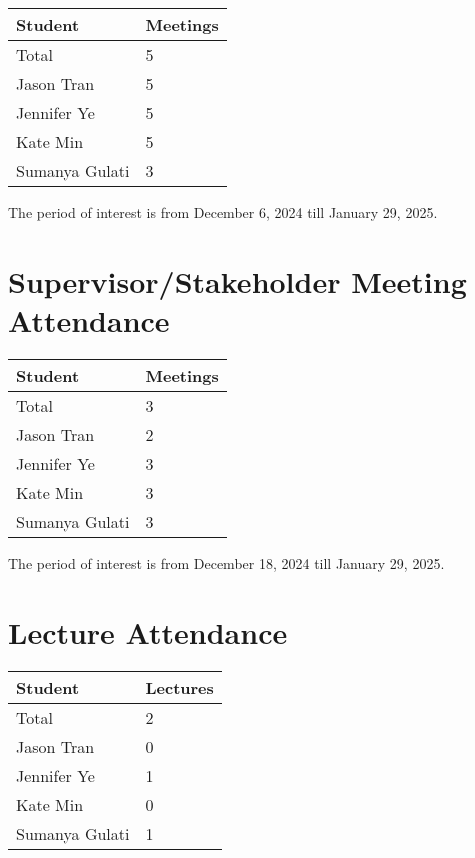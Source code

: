 \documentclass{article}
\begin{document}
\begin{table}[H]
\centering
\begin{tabular}{ll}
\toprule
\textbf{Student} & \textbf{Meetings}\\
\midrule
Total & 5\\
Jason Tran & 5\\
Jennifer Ye & 5\\
Kate Min & 5\\
Sumanya Gulati & 3\\
\bottomrule
\end{tabular}
\end{table}

The period of interest is from December 6, 2024 till January 29, 2025.

\section{Supervisor/Stakeholder Meeting Attendance}

\begin{table}[H]
\centering
\begin{tabular}{ll}
\toprule
\textbf{Student} & \textbf{Meetings}\\
\midrule
Total & 3\\
Jason Tran & 2\\
Jennifer Ye & 3\\
Kate Min & 3\\
Sumanya Gulati & 3\\
\bottomrule
\end{tabular}
\end{table}

The period of interest is from December 18, 2024 till January 29, 2025.

\section{Lecture Attendance}

\begin{table}[H]
\centering
\begin{tabular}{ll}
\toprule
\textbf{Student} & \textbf{Lectures}\\
\midrule
Total & 2\\
Jason Tran & 0\\
Jennifer Ye & 1\\
Kate Min & 0\\
Sumanya Gulati & 1\\
\bottomrule
\end{tabular}
\end{table}
\end{document}
